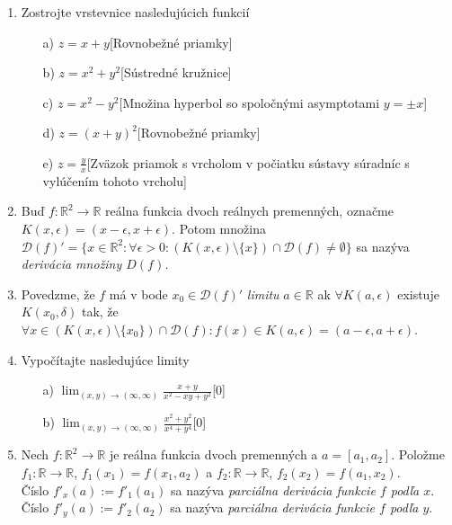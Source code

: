 \begin{enumerate}
\item Zostrojte vrstevnice nasledujúcich funkcií

\begin{enumerate}
\item[a)]{$z=x+y$}\hspace{\fill}[Rovnobežné priamky]
\item[b)]{$z=x^2+y^2$}\hspace{\fill}[Sústredné kružnice]
\item[c)]{$z=x^2-y^2$}\hspace{\fill}[Množina hyperbol so spoločnými asymptotami $y=\pm x$]
\item[d)]{$z=(x+y)^2$}\hspace{\fill}[Rovnobežné priamky]
\item[e)]{$z=\frac{y}{x}$}\hspace{\fill}[Zväzok priamok s vrcholom v počiatku sústavy súradníc s vylúčením tohoto vrcholu]
\end{enumerate}

\item Buď $f:\mathbb{R}^2 \to \mathbb{R}$ reálna funkcia dvoch reálnych premenných, označme $K(x, \epsilon)=(x-\epsilon, x+\epsilon)$. Potom množina $\mathcal{D}(f)'=\{x \in \mathbb{R}^2: \forall \epsilon>0: (K(x,\epsilon)\setminus \{x\}) \cap \mathcal{D}(f) \neq \emptyset \}$ sa nazýva \textit{derivácia množiny $D(f)$.}

\item Povedzme, že $f$ má v bode $x_0 \in \mathcal{D}(f)'$ \textit{limitu} $a \in \mathbb{R}$ ak $\forall K(a,\epsilon)$ existuje $K(x_0,\delta)$ tak, že $\forall x \in (K(x,\epsilon) \setminus \{x_0\})\cap \mathcal{D}(f):f(x) \in K(a, \epsilon)=(a-\epsilon, a+\epsilon)$.

\item Vypočítajte nasledujúce limity

\begin{enumerate}
\item[a)]{$ \lim_{(x,y) \to (\infty,\infty)} \frac{x+y}{x^2-xy+y^2} $}\hspace{\fill}[0]
\item[b)]{$ \lim_{(x,y) \to (\infty,\infty)} \frac{x^2+y^2}{x^4+y^4} $}\hspace{\fill}[0]
\end{enumerate}

\item Nech $f:\mathbb{R}^2 \to \mathbb{R}$ je reálna funkcia dvoch premenných a $a=[a_1,a_2]$. Položme $f_1:\mathbb{R}\to \mathbb{R}$, $f_1(x_1)=f(x_1,a_2)$ a $f_2:\mathbb{R}\to \mathbb{R}$, $f_2(x_2)=f(a_1,x_2)$. \\
Číslo $f'_x(a):=f'_1(a_1)$ sa nazýva \textit{parciálna derivácia funkcie $f$ podľa $x$}. \\
Číslo $f'_y(a):=f'_2(a_2)$ sa nazýva \textit{parciálna derivácia funkcie $f$ podľa $y$}. 



\end{enumerate}
